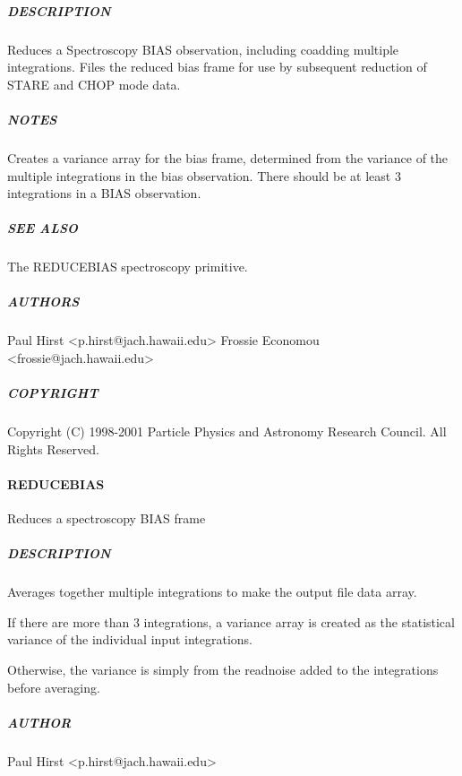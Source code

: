 \documentclass[twoside,11pt]{article}
\renewcommand{\_}{\texttt{\symbol{95}}}
\begin{document}
\subparagraph*{DESCRIPTION\label{REDUCE_BIAS_DESCRIPTION}}

Reduces a Spectroscopy BIAS observation, including coadding multiple
integrations. Files the reduced bias frame for use by subsequent
reduction of STARE and CHOP mode data.

\subparagraph*{NOTES\label{REDUCE_BIAS_NOTES}}

Creates a variance array for the bias frame, determined from the 
variance of the multiple integrations in the bias observation. There
should be at least 3 integrations in a BIAS observation.

\subparagraph*{SEE ALSO\label{REDUCE_BIAS_SEE_ALSO}}

The \_REDUCE\_BIAS\_ spectroscopy primitive.

\subparagraph*{AUTHORS\label{REDUCE_BIAS_AUTHORS}}

Paul Hirst <p.hirst@jach.hawaii.edu>
Frossie Economou <frossie@jach.hawaii.edu>

\subparagraph*{COPYRIGHT\label{REDUCE_BIAS_COPYRIGHT}}

Copyright (C) 1998-2001 Particle Physics and Astronomy Research
Council. All Rights Reserved.


\paragraph*{\_REDUCE\_BIAS\_\label{_REDUCE_BIAS_}}

Reduces a spectroscopy BIAS frame

\subparagraph*{DESCRIPTION\label{_REDUCE_BIAS__DESCRIPTION}}

Averages together multiple integrations to make the output file data array.



If there are more than 3 integrations, a variance array is created as the
statistical variance of the individual input integrations.



Otherwise, the variance is simply from the readnoise added to the integrations
before averaging.

\subparagraph*{AUTHOR\label{_REDUCE_BIAS__AUTHOR}}

Paul Hirst <p.hirst@jach.hawaii.edu>
\end{document}
